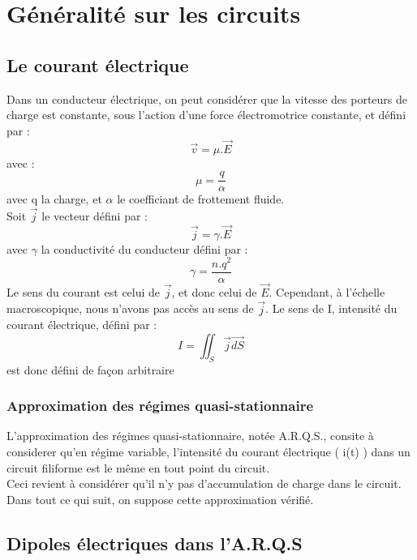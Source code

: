 \chapter{Généralité sur les circuits}
\section{Le courant électrique}
Dans un conducteur électrique, on peut considérer que la vitesse des porteurs de charge est constante, sous l'action d'une force électromotrice constante, et défini par :
$$\overrightarrow{v} = \mu.\overrightarrow{E}$$
avec : $$\mu = \dfrac{q}{\alpha}$$
avec q la charge, et $\alpha$ le coefficiant de frottement fluide.\\
Soit $\overrightarrow{j}$ le vecteur défini par :
$$\overrightarrow{j} = \gamma.\overrightarrow{E}$$
avec $\gamma$ la conductivité du conducteur défini par :
$$\gamma = \dfrac{n.q^2}{\alpha}$$
Le sens du courant est celui de $\overrightarrow{j}$, et donc celui de $\overrightarrow{E}$. Cependant, à l'échelle macroscopique, nous n'avons pas accès au sens de $\overrightarrow{j}$. Le sens de I, intensité du courant électrique, défini par :
$$I = \iint_S \overrightarrow{j}\overrightarrow{dS}$$
est donc défini de façon arbitraire
\subsection{Approximation des régimes quasi-stationnaire}
L'approximation des régimes quasi-stationnaire, notée A.R.Q.S., consite à considerer qu'en régime variable, l'intensité du courant électrique ( i(t) ) dans un circuit filiforme est le même en tout point du circuit.\\
Ceci revient à considérer qu'il n'y pas d'accumulation de charge dans le circuit.\\
Dans tout ce qui suit, on suppose cette approximation vérifié.
\section{Dipoles électriques dans l'A.R.Q.S}
